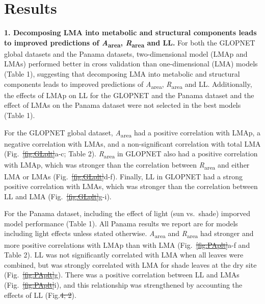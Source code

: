 \documentclass[
  12pt,
  a4paper,
,tablecaptionabove
]{scrartcl}
\providecommand{\DIFaddtex}[1]{{\protect\color{blue}\uwave{#1}}} %
\providecommand{\DIFdeltex}[1]{{\protect\color{red}\sout{#1}}}                      %
\providecommand{\DIFaddbegin}{} %
\providecommand{\DIFaddend}{} %
\providecommand{\DIFdelbegin}{} %
\providecommand{\DIFdelend}{} %
\providecommand{\DIFadd}[1]{\texorpdfstring{\DIFaddtex{#1}}{#1}} %
\providecommand{\DIFdel}[1]{\texorpdfstring{\DIFdeltex{#1}}{}} %
\newcommand{\DIFscaledelfig}{0.5}
\newlength{\DIFdelgraphicswidth} %
\newlength{\DIFdelgraphicsheight} %
\newcommand{\DIFaddincludegraphics}[2][]{{\color{blue}\fbox{\DIFOincludegraphics[#1]{#2}}}} %
\newcommand{\DIFdelincludegraphics}[2][]{%
\sbox{\DIFdelgraphicsbox}{\DIFOincludegraphics[#1]{#2}}%
\settoboxwidth{\DIFdelgraphicswidth}{\DIFdelgraphicsbox} %
\settoboxtotalheight{\DIFdelgraphicsheight}{\DIFdelgraphicsbox} %
\scalebox{\DIFscaledelfig}{%
\parbox[b]{\DIFdelgraphicswidth}{\usebox{\DIFdelgraphicsbox}\\[-\baselineskip] \rule{\DIFdelgraphicswidth}{0em}}\llap{\resizebox{\DIFdelgraphicswidth}{\DIFdelgraphicsheight}{%
\setlength{\unitlength}{\DIFdelgraphicswidth}%
\begin{picture}(1,1)%
\thicklines\linethickness{2pt} %
{\color[rgb]{1,0,0}\put(0,0){\framebox(1,1){}}}%
{\color[rgb]{1,0,0}\put(0,0){\line( 1,1){1}}}%
{\color[rgb]{1,0,0}\put(0,1){\line(1,-1){1}}}%
\end{picture}%
}\hspace*{3pt}}} %
} %
\DeclareRobustCommand{\DIFaddbegin}{\DIFOaddbegin \let\includegraphics\DIFaddincludegraphics} %
\DeclareRobustCommand{\DIFaddend}{\DIFOaddend \let\includegraphics\DIFOincludegraphics} %
\DeclareRobustCommand{\DIFdelbegin}{\DIFOdelbegin \let\includegraphics\DIFdelincludegraphics} %
\DeclareRobustCommand{\DIFdelend}{\DIFOaddend \let\includegraphics\DIFOincludegraphics} %
\begin{document}
\hypertarget{results}{%
\section{Results}\label{results}}

\textbf{1. Decomposing LMA into metabolic and structural components
leads to improved predictions of \emph{A}\textsubscript{area},
\emph{R}\textsubscript{area} and LL.} For both the GLOPNET global
datasets and the Panama datasets, two-dimensional model (LMAp and LMAs)
performed better in cross validation than one-dimensional (LMA) models
(Table 1), suggesting that decomposing LMA into metabolic and structural
components leads to improved predictions of
\emph{A}\textsubscript{area}, \emph{R}\textsubscript{area} and LL.
Additionally, the effects of LMAp on LL for the GLOPNET and the Panama
dataset and the effect of LMAs on the Panama dataset were not selected
in the best models (Table 1).

For the GLOPNET global dataset, \emph{A}\textsubscript{area} had a
positive correlation with LMAp, a negative correlation with LMAs, and a
non-significant correlation with total LMA (Fig.~\DIFdelbegin \DIFdel{\ref{fig:GLplt}}\DIFdelend \DIFaddbegin \DIFadd{\ref{fig-GLplt}}\DIFaddend a-c;
Table 2). \emph{R}\textsubscript{area} in GLOPNET also had a positive
correlation with LMAp, which was stronger than the correlation between
\emph{R}\textsubscript{area} and either LMA or LMAs
(Fig.~\DIFdelbegin \DIFdel{\ref{fig:GLplt}}\DIFdelend \DIFaddbegin \DIFadd{\ref{fig-GLplt}}\DIFaddend d-f). Finally, LL in GLOPNET had a strong positive
correlation with LMAs, which was stronger than the correlation between
LL and LMA (Fig.~\DIFdelbegin \DIFdel{\ref{fig:GLplt}}\DIFdelend \DIFaddbegin \DIFadd{\ref{fig-GLplt}}\DIFaddend g-i).

For the Panama dataset, including the effect of light (sun vs.~shade)
imporved model performance (Table 1). All Panama results we report are
for models including light effects unless stated otherwise.
\emph{A}\textsubscript{area} and \emph{R}\textsubscript{area} had
stronger and more positive correlations with LMAp than with LMA
(Fig.~\DIFdelbegin \DIFdel{\ref{fig:PAplt}}\DIFdelend \DIFaddbegin \DIFadd{\ref{fig-PAplt}}\DIFaddend a-f and Table 2). LL was not significantly
correlated with LMA when all leaves were combined, but was strongly
correlated with LMA for shade leaves at the dry site
(Fig.~\DIFdelbegin \DIFdel{\ref{fig:PAplt}}\DIFdelend \DIFaddbegin \DIFadd{\ref{fig-PAplt}}\DIFaddend g). There was a positive correlation between LL and
LMAs (Fig.~\DIFdelbegin \DIFdel{\ref{fig:PAplt}}\DIFdelend \DIFaddbegin \DIFadd{\ref{fig-PAplt}}\DIFaddend i), and this relationship was strengthened by
accounting the effects of LL (Fig.\DIFdelbegin \DIFdel{4; 2}\DIFdelend \DIFaddbegin \DIFadd{~\ref{fig-LLplt}}\DIFaddend ).
\end{document}
